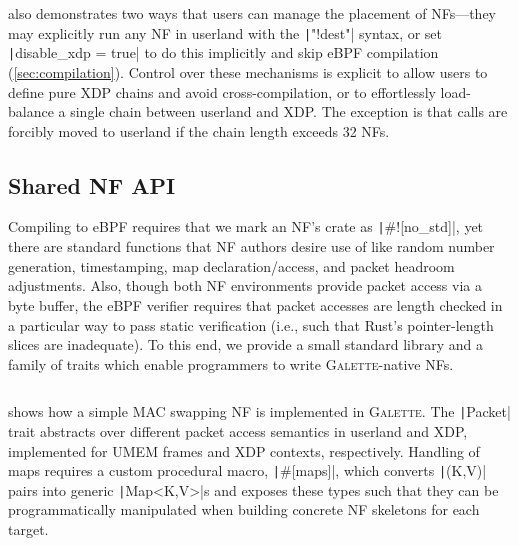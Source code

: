 \documentclass[comsoc, conference, times]{IEEEtran}
\newcommand{\ourtech}{\textsc{Galette}}
\begin{document}
 also demonstrates two ways that users can manage the placement of NFs---they may explicitly run any NF in userland with the \texttt|"!dest"| syntax, or set \texttt|disable_xdp = true| to do this implicitly and skip eBPF compilation (\cref{sec:compilation}).
Control over these mechanisms is explicit to allow users to define pure XDP chains and avoid cross-compilation, or to effortlessly load-balance a single chain between userland and XDP.
The exception is that calls are forcibly moved to userland if the chain length exceeds \numlist{32} NFs.


\subsection{Shared NF API}\label{sec:nf-api}
Compiling to eBPF requires that we mark an NF's crate as \texttt|#![no_std]|, yet there are standard functions that NF authors desire use of like random number generation, timestamping, map declaration/access, and packet headroom adjustments.
Also, though both NF environments provide packet access via a byte buffer, the eBPF verifier requires that packet accesses are length checked in a particular way to pass static verification (i.e., such that Rust's pointer-length slices are inadequate).
To this end, we provide a small standard library and a family of traits which enable programmers to write \ourtech-native NFs.

\begin{listing}
	\centering
	\inputminted[fontsize=\footnotesize]{rust}{listings/macswap.rs}
	\caption{A counting macswap function in \ourtech. \ourtech-native NFs are written in Rust with a simple API shared between eBPF and native targets.\label{listing:macswap}}
\end{listing}

 shows how a simple MAC swapping NF is implemented in \ourtech.
The \texttt|Packet| trait abstracts over different packet access semantics in userland and XDP, implemented for UMEM frames and XDP contexts, respectively.
Handling of maps requires a custom procedural macro, \texttt|#[maps]|, which converts \texttt|(K,V)| pairs into generic \texttt|Map<K,V>|s and exposes these types such that they can be programmatically manipulated when building concrete NF skeletons for each target.
\end{document}
